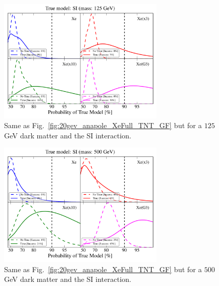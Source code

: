 \documentclass[11pt]{article}
\begin{document}
\begin{figure}
\centering
\includegraphics[width=0.7\textwidth]{plots/PDF_125GeV_SI_Higgs_50sims_Xe_Xe3x_Xe10x_XeG3_GF_TNT.pdf}
\caption{\label{fig:125gev_SI_Higgs_XeFull_TNT_GF}
Same as Fig.~\ref{fig:20gev_anapole_XeFull_TNT_GF} but for a $125$ GeV dark matter and the SI interaction.}
\end{figure}


\begin{figure}
\centering
\includegraphics[width=0.7\textwidth]{plots/PDF_500GeV_SI_Higgs_50sims_Xe_Xe3x_Xe10x_XeG3_GF_TNT.pdf}
\caption{\label{fig:500gev_SI_Higgs_XeFull_TNT_GF}
Same as Fig.~\ref{fig:20gev_anapole_XeFull_TNT_GF} but for a $500$ GeV dark matter and the SI interaction.}
\end{figure}



\end{document}
